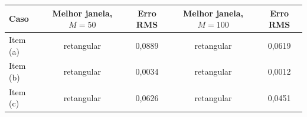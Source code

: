 \begin{tabular}{lcccc}
\toprule
Caso & Melhor janela, $M=50$ & Erro RMS & Melhor janela, $M=100$ & Erro RMS \\
\midrule
Item (a) & retangular & 0,0889 & retangular & 0,0619 \\
Item (b) & retangular & 0,0034 & retangular & 0,0012 \\
Item (c) & retangular & 0,0626 & retangular & 0,0451 \\
\bottomrule
\end{tabular}